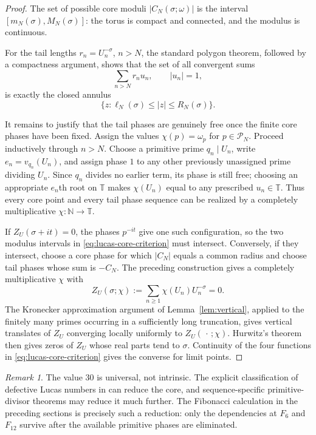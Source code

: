 \documentclass[11pt]{article}
\theoremstyle{remark}
\newtheorem{remark}[theorem]{Remark}
\newcommand{\T}{\mathbb T}
\begin{document}
\begin{proof}
The set of possible core moduli $|C_N(\sigma;\omega)|$ is the interval $[m_N(\sigma),M_N(\sigma)]$: the torus is compact and connected, and the modulus is continuous.

For the tail lengths $r_n=U_n^{-\sigma}$, $n>N$, the standard polygon theorem, followed by a compactness argument, shows that the set of all convergent sums
\[
\sum_{n>N}r_n u_n,\qquad |u_n|=1,
\]
is exactly the closed annulus
\[
\{z:\ell_N(\sigma)\le |z|\le R_N(\sigma)\}.
\]

It remains to justify that the tail phases are genuinely free once the finite core phases have been fixed.  Assign the values $\chi(p)=\omega_p$ for $p\in\mathcal P_N$.  Proceed inductively through $n>N$.  Choose a primitive prime $q_n\mid U_n$, write $e_n=v_{q_n}(U_n)$, and assign phase $1$ to any other previously unassigned prime dividing $U_n$.  Since $q_n$ divides no earlier term, its phase is still free; choosing an appropriate $e_n$th root on $\T$ makes $\chi(U_n)$ equal to any prescribed $u_n\in\T$.  Thus every core point and every tail phase sequence can be realized by a completely multiplicative $\chi:\mathbb N\to\T$.

If $Z_U(\sigma+it)=0$, the phases $p^{-it}$ give one such configuration, so the two modulus intervals in \eqref{eq:lucas-core-criterion} must intersect.  Conversely, if they intersect, choose a core phase for which $|C_N|$ equals a common radius and choose tail phases whose sum is $-C_N$.  The preceding construction gives a completely multiplicative $\chi$ with
\[
Z_U(\sigma;\chi):=\sum_{n\ge1}\chi(U_n)U_n^{-\sigma}=0.
\]
The Kronecker approximation argument of Lemma~\ref{lem:vertical}, applied to the finitely many primes occurring in a sufficiently long truncation, gives vertical translates of $Z_U$ converging locally uniformly to $Z_U(\,\cdot\,;\chi)$.  Hurwitz's theorem then gives zeros of $Z_U$ whose real parts tend to $\sigma$.  Continuity of the four functions in \eqref{eq:lucas-core-criterion} gives the converse for limit points.
\end{proof}

\begin{remark}
The value $30$ is universal, not intrinsic.  The explicit classification of defective Lucas numbers in \cite{BHV2001} can reduce the core, and sequence-specific primitive-divisor theorems may reduce it much further.  The Fibonacci calculation in the preceding sections is precisely such a reduction: only the dependencies at $F_6$ and $F_{12}$ survive after the available primitive phases are eliminated.
\end{remark}
\end{document}
